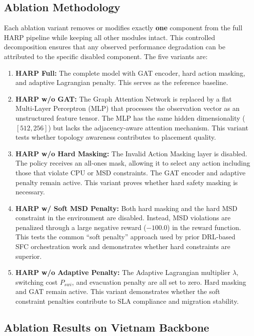 \documentclass[12pt, a4paper, reqno, oneside]{book}
\begin{document}
\subsection{Ablation Methodology}
Each ablation variant removes or modifies exactly \textbf{one} component from the full HARP pipeline while keeping all other modules intact. This controlled decomposition ensures that any observed performance degradation can be attributed to the specific disabled component. The five variants are:

\begin{enumerate}
    \item \textbf{HARP Full:} The complete model with GAT encoder, hard action masking, and adaptive Lagrangian penalty. This serves as the reference baseline.
    \item \textbf{HARP w/o GAT:} The Graph Attention Network is replaced by a flat Multi-Layer Perceptron (MLP) that processes the observation vector as an unstructured feature tensor. The MLP has the same hidden dimensionality ($[512, 256]$) but lacks the adjacency-aware attention mechanism. This variant tests whether topology awareness contributes to placement quality.
    \item \textbf{HARP w/o Hard Masking:} The Invalid Action Masking layer is disabled. The policy receives an all-ones mask, allowing it to select any action including those that violate CPU or MSD constraints. The GAT encoder and adaptive penalty remain active. This variant proves whether hard safety masking is necessary.
    \item \textbf{HARP w/ Soft MSD Penalty:} Both hard masking and the hard MSD constraint in the environment are disabled. Instead, MSD violations are penalized through a large negative reward ($-100.0$) in the reward function. This tests the common ``soft penalty'' approach used by prior DRL-based SFC orchestration work and demonstrates whether hard constraints are superior.
    \item \textbf{HARP w/o Adaptive Penalty:} The Adaptive Lagrangian multiplier $\lambda$, switching cost $P_{swi}$, and evacuation penalty are all set to zero. Hard masking and GAT remain active. This variant demonstrates whether the soft constraint penalties contribute to SLA compliance and migration stability.
\end{enumerate}

\subsection{Ablation Results on Vietnam Backbone}
\end{document}
